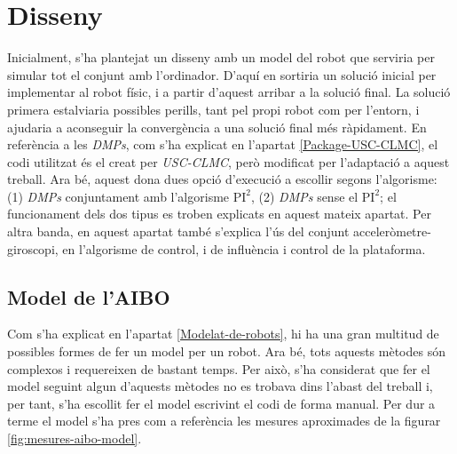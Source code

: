\documentclass[12pt,a4paper,final,twoside]{article}
\begin{document}
\newpage
\section{Disseny}

Inicialment, s'ha plantejat un disseny amb un model del robot que serviria per simular tot el conjunt amb l'ordinador. D'aquí en sortiria un solució inicial per implementar al robot físic, i a partir d'aquest arribar a la solució final. La solució primera estalviaria possibles perills, tant pel propi robot com per l'entorn, i ajudaria a aconseguir la convergència a una solució final més ràpidament. En referència a les \textit{DMPs}, com s'ha explicat en l'apartat \ref{Package-USC-CLMC}, el codi utilitzat és el creat per \textit{USC-CLMC}, però modificat per l'adaptació a aquest treball. Ara bé, aquest dona dues opció d'execució a escollir segons l'algorisme: (1) \textit{DMPs} conjuntament amb l'algorisme $\mathrm{PI^2}$, (2) \textit{DMPs} sense el $\mathrm{PI^2}$; el funcionament dels dos tipus es troben explicats en aquest mateix apartat. Per altra banda, en aquest apartat també s'explica l'ús del conjunt acceleròmetre-giroscopi, en l'algorisme de control, i de influència i control de la plataforma.






\subsection{Model de l'AIBO}

Com s'ha explicat en l'apartat \ref{Modelat-de-robots}, hi ha una gran multitud de possibles formes de fer un model per un robot. Ara bé, tots aquests mètodes són complexos i requereixen de bastant temps. Per això, s'ha considerat que fer el model seguint algun d'aquests mètodes no es trobava dins l'abast del treball i, per tant, s'ha escollit fer el model escrivint el codi de forma manual. Per dur a terme el model s'ha pres com a referència les mesures aproximades de la figurar \ref{fig:mesures-aibo-model}.
\end{document}

